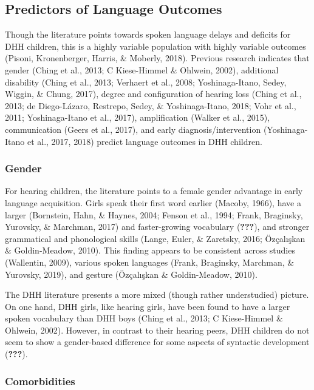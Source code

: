 \documentclass[english,man,floatsintext]{apa6}
\begin{document}
\hypertarget{predictors-of-language-outcomes}{%
\subsection{Predictors of Language Outcomes}\label{predictors-of-language-outcomes}}

Though the literature points towards spoken language delays and deficits for DHH children, this is a highly variable population with highly variable outcomes (Pisoni, Kronenberger, Harris, \& Moberly, 2018). Previous research indicates that gender (Ching et al., 2013; C Kiese-Himmel \& Ohlwein, 2002), additional disability (Ching et al., 2013; Verhaert et al., 2008; Yoshinaga-Itano, Sedey, Wiggin, \& Chung, 2017), degree and configuration of hearing loss (Ching et al., 2013; de Diego-Lázaro, Restrepo, Sedey, \& Yoshinaga-Itano, 2018; Vohr et al., 2011; Yoshinaga-Itano et al., 2017), amplification (Walker et al., 2015), communication (Geers et al., 2017), and early diagnosis/intervention (Yoshinaga-Itano et al., 2017, 2018) predict language outcomes in DHH children.

\hypertarget{gender}{%
\subsubsection{Gender}\label{gender}}

For hearing children, the literature points to a female gender advantage in early language acquisition. Girls speak their first word earlier (Macoby, 1966), have a larger (Bornstein, Hahn, \& Haynes, 2004; Fenson et al., 1994; Frank, Braginsky, Yurovsky, \& Marchman, 2017) and faster-growing vocabulary ({\textbf{???}}), and stronger grammatical and phonological skills (Lange, Euler, \& Zaretsky, 2016; Özçalışkan \& Goldin-Meadow, 2010). This finding appears to be consistent across studies (Wallentin, 2009), various spoken languages (Frank, Braginsky, Marchman, \& Yurovsky, 2019), and gesture (Özçalışkan \& Goldin-Meadow, 2010).

The DHH literature presents a more mixed (though rather understudied) picture. On one hand, DHH girls, like hearing girls, have been found to have a larger spoken vocabulary than DHH boys (Ching et al., 2013; C Kiese-Himmel \& Ohlwein, 2002). However, in contrast to their hearing peers, DHH children do not seem to show a gender-based difference for some aspects of syntactic development ({\textbf{???}}).

\hypertarget{comorbidities}{%
\subsubsection{Comorbidities}\label{comorbidities}}
\end{document}
